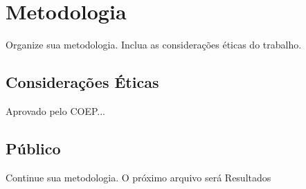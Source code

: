 \setlength{\parskip}{1.5pt}
\chapter[Metodologia]{Metodologia}

Organize sua metodologia. 
Inclua as considerações éticas do trabalho.


\section{Considerações Éticas}
Aprovado pelo COEP...

\section{Público}

Continue sua metodologia. O próximo arquivo será Resultados